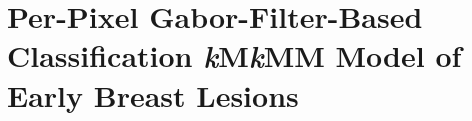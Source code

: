 \chapter{Per-Pixel Gabor-Filter-Based Classification \emph{k}M\emph{k}MM Model of Early Breast Lesions}




